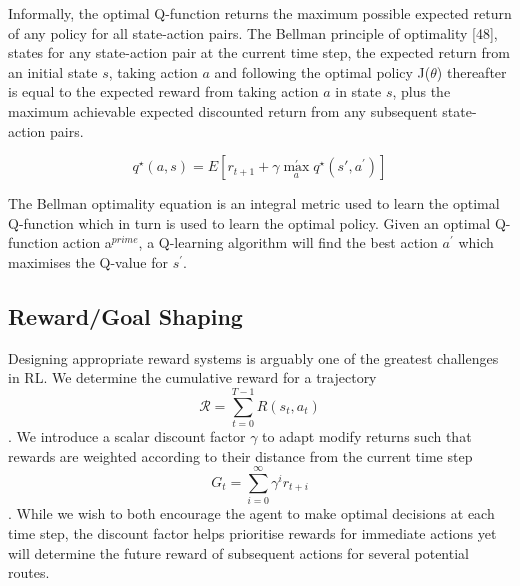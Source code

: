 \documentclass[runningheads]{llncs}
\begin{document}
Informally, the optimal Q-function returns the maximum possible expected return
of any policy for all state-action pairs. The Bellman principle of optimality [48], states for any state-action pair at the current time step, the expected return from an initial state $s$, taking action $a$ and following the optimal policy J($\theta$) thereafter is equal to the expected reward from taking action $a$ in state $s$, plus the maximum achievable expected discounted return from any subsequent state-action pairs.

\begin{equation}
	q^\star(a,s) = E \left[r_{t+1} + \gamma \max_a^\prime q^\star(s\prime, a^\prime)\right]
\end{equation}

The Bellman optimality equation is an integral metric used to learn the optimal Q-function which in turn is used to learn the optimal policy. Given an optimal Q-function action a$^{prime}$, a Q-learning algorithm will find the best action $a^{\prime}$ which maximises the Q-value for $s^{\prime}$.

\subsection{Reward/Goal Shaping}
Designing appropriate reward systems is arguably one of the greatest challenges in RL. We determine the cumulative reward for a trajectory  \begin{equation}
	\mathcal{R} = \sum_{t=0}^{T-1} R(s_t, a_t)
\end{equation}. We introduce a scalar discount factor $\gamma$ to adapt modify returns such that rewards are weighted according to their distance from the current time step \begin{equation}
	G_t = \sum_{i=0}^{\infty} \gamma^{i}r_{t+i}
\end{equation}. While we wish to both encourage the agent to make optimal decisions at each time step, the discount factor helps prioritise rewards for immediate actions yet will determine the future reward of subsequent actions for several potential routes.
\end{document}
